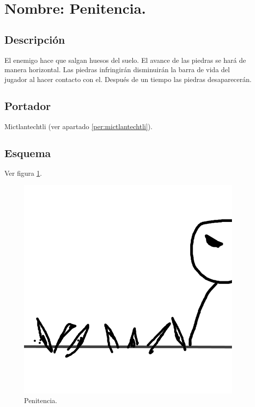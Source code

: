 \section{Nombre: Penitencia.}\label{hab.Penitencia}
\subsection{Descripción}
El enemigo hace que salgan huesos del suelo. El avance de las piedras se hará de manera horizontal. Las piedras infringirán disminuirán la barra de vida del jugador al hacer contacto con el. Después de un tiempo las piedras desaparecerán.
\subsection{Portador}
Mictlantechtli (ver apartado \ref{per:mictlantechtli}).	
\subsection{Esquema}
			Ver figura \ref{fig:penitencia}.
			\begin{figure}
				\centering
				\includegraphics[height=0.2 \textheight]{Imagenes/penitencia}
				\caption{Penitencia.}
				\label{fig:penitencia}
			\end{figure}


